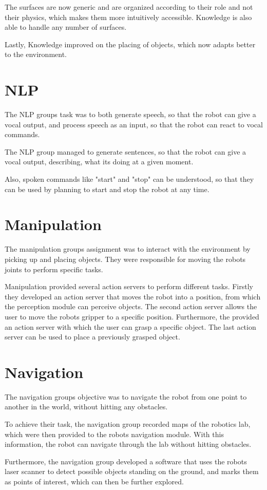 \documentclass[main.tex]{subfiles}
\begin{document}
		The surfaces are now generic and are organized according to their role and not their physics, which makes them more intuitively accessible. Knowledge is also able to handle any number of surfaces.
		
		Lastly, Knowledge improved on the placing of objects, which now adapts better to the environment. 		
		\section{NLP}
		The NLP groups task was to both generate speech, so that the robot can give a vocal output, and process speech as an input, so that the robot can react to vocal commands.
		
		The NLP group managed to generate sentences, so that the robot can give a vocal output, describing, what its doing at a given moment.
		
		Also, spoken commands like "start" and "stop" can be understood, so that they can be used by planning to start and stop the robot at any time.
		
		\section{Manipulation}
		The manipulation groups assignment was to interact with the environment by picking up and placing objects. They were responsible for moving the robots joints to perform specific tasks.
		
		Manipulation provided several action servers to perform different tasks. Firstly they developed an action server that moves the robot into a position, from which the perception module can perceive objects. The second action server allows the user to move the robots gripper to a specific position. Furthermore, the provided an action server with which the user can grasp a specific object. The last action server can be used to place a previously grasped object.
		
		\section{Navigation}	  	
		The navigation groups objective was to navigate the robot from one point to another in the world, without hitting any obstacles.
		
		To achieve their task, the navigation group recorded maps of the robotics lab, which were then provided to the robots navigation module. With this information, the robot can navigate through the lab without hitting obstacles.
		
		Furthermore, the navigation group developed a software that uses the robots laser scanner to detect possible objects standing on the ground, and marks them as points of interest, which can then be further explored.

		
	\endgroup
\end{document}
